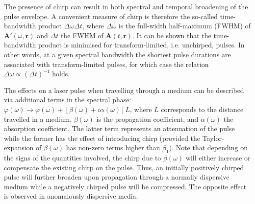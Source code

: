\documentclass[a4paper]{jpconf}
\begin{document}
The presence of chirp can result in both spectral and temporal broadening of the pulse envelope. A convenient measure of chirp is therefore the so-called time-bandwidth product $\Delta \omega \Delta t$, where $\Delta \omega$ is the full-width half-maximum (FWHM) of $\mathbf{A}'(\omega, \mathbf{r})$ and $\Delta t$ the FWHM of $\mathbf{A}(t, \mathbf{r})$. It can be shown that the time-bandwidth product is minimised for transform-limited, i.e. unchirped, pulses. In other words, at a given spectral bandwidth the shortest pulse durations are associated with transform-limited pulses, for which case the relation $\Delta \omega \propto (\Delta t)^{-1}$ holds. \par 
The effects on a laser pulse when travelling through a medium can be described via additional terms in the spectral phase: $\varphi(\omega) \to \varphi(\omega) + [\beta(\omega) + i \alpha(\omega)]L$, where $L$ corresponds to the distance travelled in a medium, $\beta(\omega)$ is the propagation coefficient, and $\alpha(\omega)$ the absorption coefficient. The latter term represents an attenuation of the pulse while the former has the effect of introducing chirp (provided the Taylor-expansion of $\beta(\omega)$ has non-zero terms higher than $\beta_1$). Note that depending on the signs of the quantities involved, the chirp due to $\beta(\omega)$ will either increase or compensate the existing chirp on the pulse. Thus, an initially positively chirped pulse will further broaden upon propagation through a normally dispersive medium while a negatively chirped pulse will be compressed. The opposite effect is observed in anomalously dispersive media.
\end{document}
